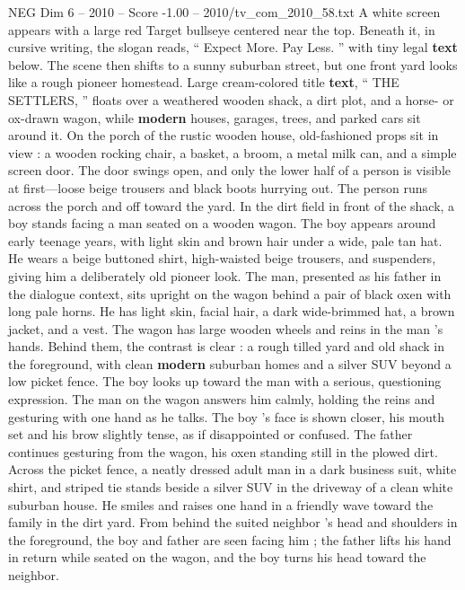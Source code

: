 \begin{textsample}{NEG Dim 6 – 2010 – Score -1.00 – 2010/tv\_com\_2010\_58.txt}  \label{ex:f6_neg_010}
A white screen appears with a large red Target bullseye centered near the top.
Beneath it, in cursive writing, the slogan reads, “ Expect More.
Pay Less. ” with tiny legal \textbf{text} below.
The scene then shifts to a sunny suburban street, but one front yard looks like a rough pioneer homestead.
Large cream-colored title \textbf{text}, “ THE SETTLERS, ” floats over a weathered wooden shack, a dirt plot, and a horse- or ox-drawn wagon, while \textbf{modern} houses, garages, trees, and parked cars sit around it.
On the porch of the rustic wooden house, old-fashioned props sit in view : a wooden rocking chair, a basket, a broom, a metal milk can, and a simple screen door.
The door swings open, and only the lower half of a person is visible at first—loose beige trousers and black boots hurrying out.
The person runs across the porch and off toward the yard.
In the dirt field in front of the shack, a boy stands facing a man seated on a wooden wagon.
The boy appears around early teenage years, with light skin and brown hair under a wide, pale tan hat.
He wears a beige buttoned shirt, high-waisted beige trousers, and suspenders, giving him a deliberately old pioneer look.
The man, presented as his father in the dialogue context, sits upright on the wagon behind a pair of black oxen with long pale horns.
He has light skin, facial hair, a dark wide-brimmed hat, a brown jacket, and a vest.
The wagon has large wooden wheels and reins in the man ’s hands.
Behind them, the contrast is clear : a rough tilled yard and old shack in the foreground, with clean \textbf{modern} suburban homes and a silver SUV beyond a low picket fence.
The boy looks up toward the man with a serious, questioning expression.
The man on the wagon answers him calmly, holding the reins and gesturing with one hand as he talks.
The boy ’s face is shown closer, his mouth set and his brow slightly tense, as if disappointed or confused.
The father continues gesturing from the wagon, his oxen standing still in the plowed dirt.
Across the picket fence, a neatly dressed adult man in a dark business suit, white shirt, and striped tie stands beside a silver SUV in the driveway of a clean white suburban house.
He smiles and raises one hand in a friendly wave toward the family in the dirt yard.
From behind the suited neighbor ’s head and shoulders in the foreground, the boy and father are seen facing him ; the father lifts his hand in return while seated on the wagon, and the boy turns his head toward the neighbor.

\end{textsample}
